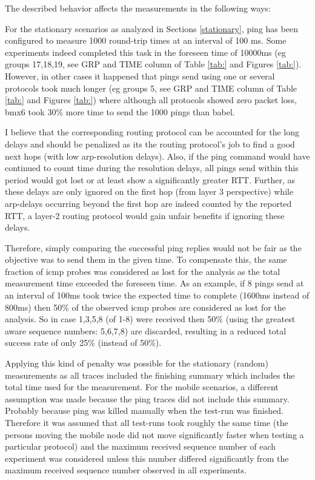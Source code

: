 \documentclass[a4paper,12pt,twoside]{article}
\begin{document}
The described behavior affects the measurements in the following ways:

For the stationary scenarios as analyzed in Sections \ref{stationary},
ping has been configured to measure 1000 round-trip times at an
interval of 100 ms. Some experiments indeed completed this task in the
foreseen time of 10000ms (eg groups 17,18,19, see GRP and TIME column
of Table \ref{tab:} and Figures \ref{tab:}).  However, in other cases
it happened that pings send using one or several protocols took much
longer (eg groups 5, see GRP and TIME column of Table \ref{tab:} and
Figures \ref{tab:}) where although all protocols showed zero packet
loss, bmx6 took 30\% more time to send the 1000 pings than babel. 

I believe that the corresponding routing protocol can be accounted
for the long delays and should be penalized as its the routing
protocol's job to find a good next hops (with low arp-resolution
delays). Also, if the ping command would have continued to count time
during the resolution delays, all pings send within this period would
got lost or at least show a significantly greater RTT. Further, as
these delays are only ignored on the first hop (from layer 3
perspective) while arp-delays occurring beyond the first hop are indeed
counted by the reported RTT, a layer-2 routing protocol would gain
unfair benefits if ignoring these delays.


Therefore, simply comparing the successful ping replies would not be
fair as the objective was to send them in the given time.  To
compensate this, the same fraction of icmp probes was considered as
lost for the analysis as the total measurement time exceeded the
foreseen time. As an example, if 8 pings send at an interval of 100ms
took twice the expected time to complete (1600ms instead of 800ms)
then 50\% of the observed icmp probes are considered as lost for the
analysis.  So in case 1,3,5,8 (of 1-8) were received then 50\% (using
the greatest aware sequence numbers: 5,6,7,8) are discarded, resulting
in a reduced total success rate of only 25\% (instead of 50\%).

Applying this kind of penalty was possible for the stationary (random)
measurements as all traces included the finishing summary which includes
the total time used for the measurement.
For the mobile scenarios, a different assumption was made because the ping
traces did not include this summary. Probably because ping was killed manually
when the test-run was finished. Therefore it was assumed that all test-runs
took roughly the same time (the persons moving the mobile node did not move
significantly faster when testing a particular protocol) and the maximum 
received sequence number of each experiment was considered unless this 
number differed significantly from the maximum received sequence number 
observed in all experiments.
\end{document}
